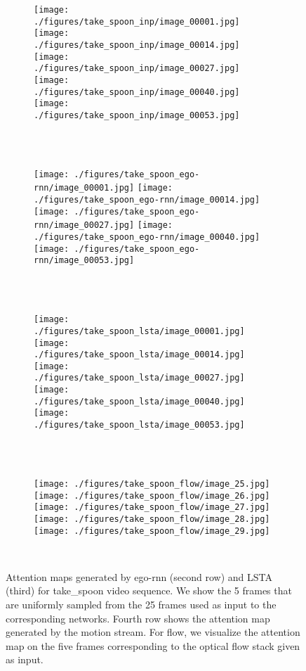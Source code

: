 \documentclass[10pt,twocolumn,letterpaper]{article}
\begin{document}
\begin{figure*}[t]
	\centering      
	\begin{subfigure}[b]{0.95\textwidth}
		\texttt{[image: ./figures/take\_spoon\_inp/image\_00001.jpg]}
		\texttt{[image: ./figures/take\_spoon\_inp/image\_00014.jpg]}
		\texttt{[image: ./figures/take\_spoon\_inp/image\_00027.jpg]}
		\texttt{[image: ./figures/take\_spoon\_inp/image\_00040.jpg]}
		\texttt{[image: ./figures/take\_spoon\_inp/image\_00053.jpg]}
	\end{subfigure}\\ \vskip 2mm
	\ 
	\begin{subfigure}[b]{0.95\textwidth}
		\texttt{[image: ./figures/take\_spoon\_ego-rnn/image\_00001.jpg]}
		\texttt{[image: ./figures/take\_spoon\_ego-rnn/image\_00014.jpg]}
		\texttt{[image: ./figures/take\_spoon\_ego-rnn/image\_00027.jpg]}
		\texttt{[image: ./figures/take\_spoon\_ego-rnn/image\_00040.jpg]}
		\texttt{[image: ./figures/take\_spoon\_ego-rnn/image\_00053.jpg]}
	\end{subfigure}\\ \vskip 2mm
	\ 
	\begin{subfigure}[b]{0.95\textwidth}
		\texttt{[image: ./figures/take\_spoon\_lsta/image\_00001.jpg]}
		\texttt{[image: ./figures/take\_spoon\_lsta/image\_00014.jpg]}
		\texttt{[image: ./figures/take\_spoon\_lsta/image\_00027.jpg]}
		\texttt{[image: ./figures/take\_spoon\_lsta/image\_00040.jpg]}
		\texttt{[image: ./figures/take\_spoon\_lsta/image\_00053.jpg]}
	\end{subfigure}\\ \vskip 2mm	       
	\ 
	\begin{subfigure}[b]{0.95\textwidth}
		\texttt{[image: ./figures/take\_spoon\_flow/image\_25.jpg]}
		\texttt{[image: ./figures/take\_spoon\_flow/image\_26.jpg]}
		\texttt{[image: ./figures/take\_spoon\_flow/image\_27.jpg]}
		\texttt{[image: ./figures/take\_spoon\_flow/image\_28.jpg]}
		\texttt{[image: ./figures/take\_spoon\_flow/image\_29.jpg]}
	\end{subfigure}\\ \vskip 2mm			 
	\caption{Attention maps generated by ego-rnn (second row) and LSTA (third) for take\_spoon video sequence. We show the 5 frames that are uniformly sampled from the 25 frames used as input to the corresponding networks. Fourth row shows the attention map generated by the motion stream. For flow, we visualize the attention map on the five frames corresponding to the optical flow stack given as input.}
	\label{fig:att_map_take_spoon}
\end{figure*}

 
\end{document}
